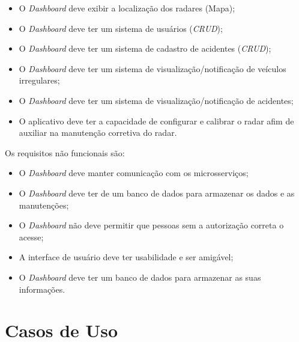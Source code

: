 \begin{itemize}
    \item O \textit{Dashboard} deve exibir a localização dos radares (Mapa);
\end{itemize}

\begin{itemize}
    \item O \textit{Dashboard} deve ter um sistema de usuários (\textit{CRUD});
\end{itemize}


\begin{itemize}
    \item O \textit{Dashboard} deve ter um sistema de cadastro de acidentes (\textit{CRUD});
\end{itemize} 

\begin{itemize}
    \item O \textit{Dashboard} deve ter um sistema de visualização/notificação de veículos irregulares;
\end{itemize}

\begin{itemize}
    \item O \textit{Dashboard} deve ter um sistema de visualização/notificação de acidentes;
\end{itemize}
 
\begin{itemize}
    \item O aplicativo deve ter a capacidade de configurar e calibrar o radar afim de auxiliar na manutenção corretiva do radar.
\end{itemize}

Os requisitos não funcionais são:

\begin{itemize}
    \item O \textit{Dashboard} deve manter comunicação com os microsserviços;
    \item O \textit{Dashboard} deve ter de um banco de dados para armazenar os dados e as manutenções;
    \item O \textit{Dashboard} não deve permitir que pessoas sem a autorização correta o acesse;
    \item A interface de usuário deve ter usabilidade e ser amigável;
    \item O \textit{Dashboard} deve ter um banco de dados para armazenar as suas informações.
\end{itemize}

\section{Casos de Uso}

